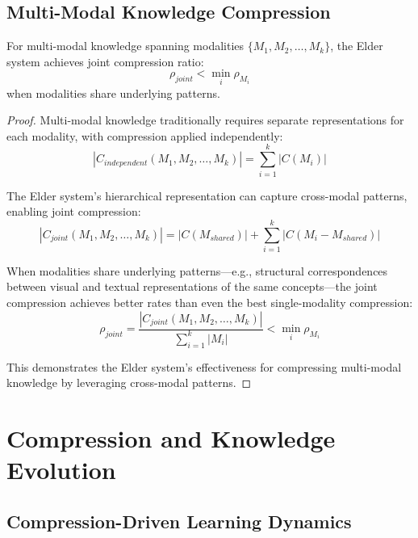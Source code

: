 \subsection{Multi-Modal Knowledge Compression}

\begin{theorem}
For multi-modal knowledge spanning modalities $\{M_1, M_2, \ldots, M_k\}$, the Elder system achieves joint compression ratio:
\begin{equation}
\rho_{joint} < \min_{i} \rho_{M_i}
\end{equation}
when modalities share underlying patterns.
\end{theorem}

\begin{proof}
Multi-modal knowledge traditionally requires separate representations for each modality, with compression applied independently:
\begin{equation}
|C_{independent}(M_1, M_2, \ldots, M_k)| = \sum_{i=1}^k |C(M_i)|
\end{equation}

The Elder system's hierarchical representation can capture cross-modal patterns, enabling joint compression:
\begin{equation}
|C_{joint}(M_1, M_2, \ldots, M_k)| = |C(M_{shared})| + \sum_{i=1}^k |C(M_i - M_{shared})|
\end{equation}

When modalities share underlying patterns—e.g., structural correspondences between visual and textual representations of the same concepts—the joint compression achieves better rates than even the best single-modality compression:
\begin{equation}
\rho_{joint} = \frac{|C_{joint}(M_1, M_2, \ldots, M_k)|}{\sum_{i=1}^k |M_i|} < \min_{i} \rho_{M_i}
\end{equation}

This demonstrates the Elder system's effectiveness for compressing multi-modal knowledge by leveraging cross-modal patterns.
\end{proof}

\section{Compression and Knowledge Evolution}

\subsection{Compression-Driven Learning Dynamics}

